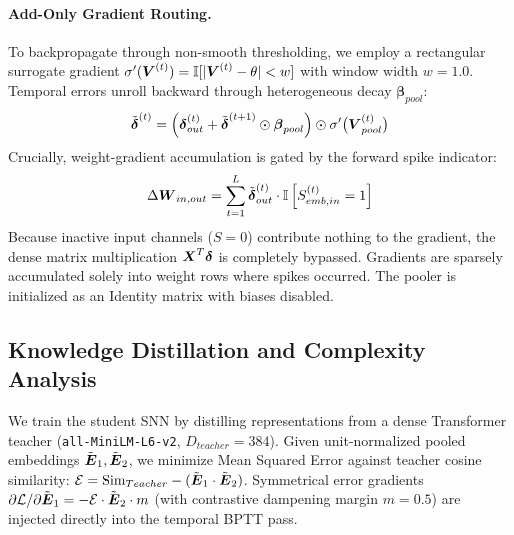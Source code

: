 \documentclass[runningheads]{llncs}
\begin{document}
\paragraph{Add-Only Gradient Routing.} To backpropagate through non-smooth thresholding, we employ a rectangular surrogate gradient $\sigma'(\boldsymbol{V}^{(t)}) = \mathbb{I}[|\boldsymbol{V}^{(t)} - \theta| < w]$ with window width $w = 1.0$. Temporal errors unroll backward through heterogeneous decay $\bm{\beta}_{pool}$:
\begin{equation}
\tilde{\boldsymbol{\delta}}^{(t)} = \left( \boldsymbol{\delta}_{out}^{(t)} + \tilde{\boldsymbol{\delta}}^{(t+1)} \odot \boldsymbol{\beta}_{pool} \right) \odot \sigma'\big(\boldsymbol{V}_{pool}^{(t)}\big)
\end{equation}
Crucially, weight-gradient accumulation is gated by the forward spike indicator:
\begin{equation}
\Delta \boldsymbol{W}_{in, out} = \sum_{t=1}^{L} \tilde{\boldsymbol{\delta}}^{(t)}_{out} \cdot \mathbb{I}\left[ S_{emb, in}^{(t)} = 1 \right]
\end{equation}
Because inactive input channels ($S=0$) contribute nothing to the gradient, the dense matrix multiplication $\boldsymbol{X}^T \boldsymbol{\delta}$ is completely bypassed. Gradients are sparsely accumulated solely into weight rows where spikes occurred. The pooler is initialized as an Identity matrix with biases disabled.

\subsection{Knowledge Distillation and Complexity Analysis}
We train the student SNN by distilling representations from a dense Transformer teacher (\texttt{all-MiniLM-L6-v2}, $D_{teacher}=384$). Given unit-normalized pooled embeddings $\tilde{\boldsymbol{E}}_1, \tilde{\boldsymbol{E}}_2$, we minimize Mean Squared Error against teacher cosine similarity: $\mathcal{E} = \text{Sim}_{Teacher} - (\tilde{\boldsymbol{E}}_1 \cdot \tilde{\boldsymbol{E}}_2)$. Symmetrical error gradients $\partial \mathcal{L} / \partial \tilde{\boldsymbol{E}}_{1} = -\mathcal{E} \cdot \tilde{\boldsymbol{E}}_{2} \cdot m$ (with contrastive dampening margin $m=0.5$) are injected directly into the temporal BPTT pass.
\end{document}
